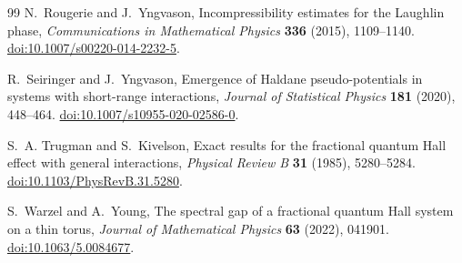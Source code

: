 \begin{thebibliography}{99}
N.~Rougerie and J.~Yngvason,
Incompressibility estimates for the Laughlin phase,
\emph{Communications in Mathematical Physics} \textbf{336} (2015), 1109--1140.
\href{https://doi.org/10.1007/s00220-014-2232-5}{doi:10.1007/s00220-014-2232-5}.

R.~Seiringer and J.~Yngvason,
Emergence of Haldane pseudo-potentials in systems with short-range interactions,
\emph{Journal of Statistical Physics} \textbf{181} (2020), 448--464.
\href{https://doi.org/10.1007/s10955-020-02586-0}{doi:10.1007/s10955-020-02586-0}.

S.~A. Trugman and S.~Kivelson,
Exact results for the fractional quantum Hall effect with general interactions,
\emph{Physical Review B} \textbf{31} (1985), 5280--5284.
\href{https://doi.org/10.1103/PhysRevB.31.5280}{doi:10.1103/PhysRevB.31.5280}.

S.~Warzel and A.~Young,
The spectral gap of a fractional quantum Hall system on a thin torus,
\emph{Journal of Mathematical Physics} \textbf{63} (2022), 041901.
\href{https://doi.org/10.1063/5.0084677}{doi:10.1063/5.0084677}.

\end{thebibliography}
\endgroup
